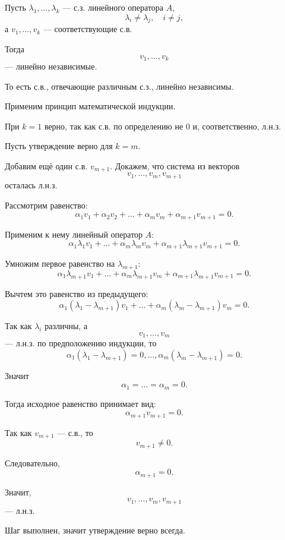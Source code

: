 \begin{theorem}
    Пусть $\lambda_1, \ldots, \lambda_k$ --- с.з. линейного оператора $A$,
    \[
        \lambda_i \neq \lambda_j,\quad i \neq j,
    \]
    а $v_1,\ldots,v_k$ --- соответствующие с.в.
    
    Тогда
    \[
        v_1,\ldots,v_k
    \]
    --- линейно независимые.
    
    То есть с.в., отвечающие различным с.з., линейно независимы.
\end{theorem}

\begin{Proof}
    Применим принцип математической индукции.
    
    При $k = 1$ верно, так как с.в. по определению не $0$ и, соответственно, л.н.з.
    
    Пусть утверждение верно для $k = m$.
    
    Добавим ещё один с.в. $v_{m+1}$. Докажем, что система из векторов
    \[
        v_1,\ldots,v_m,v_{m+1}
    \]
    осталась л.н.з.
    
    Рассмотрим равенство:
    \[
        \alpha_1v_1+\alpha_2v_2+\ldots+\alpha_mv_m+\alpha_{m+1}v_{m+1}=0.
    \]
    
    Применим к нему линейный оператор $A$:
    \[
        \alpha_1\lambda_1v_1+\ldots+\alpha_m\lambda_mv_m
        +\alpha_{m+1}\lambda_{m+1}v_{m+1}=0.
    \]
    
    Умножим первое равенство на $\lambda_{m+1}$:
    \[
        \alpha_1\lambda_{m+1}v_1+\ldots+\alpha_m\lambda_{m+1}v_m
        +\alpha_{m+1}\lambda_{m+1}v_{m+1}=0.
    \]
    
    Вычтем это равенство из предыдущего:
    \[
        \alpha_1(\lambda_1-\lambda_{m+1})v_1
        +\ldots+
        \alpha_m(\lambda_m-\lambda_{m+1})v_m
        =
        0.
    \]
    
    Так как $\lambda_i$ различны, а
    \[
        v_1,\ldots,v_m
    \]
    --- л.н.з. по предположению индукции, то
    \[
        \alpha_1(\lambda_1-\lambda_{m+1})=0,
        \ldots,
        \alpha_m(\lambda_m-\lambda_{m+1})=0.
    \]
    
    Значит
    \[
        \alpha_1=\ldots=\alpha_m=0.
    \]
    
    Тогда исходное равенство принимает вид:
    \[
        \alpha_{m+1}v_{m+1}=0.
    \]
    
    Так как $v_{m+1}$ --- с.в., то
    \[
        v_{m+1}\neq 0.
    \]
    
    Следовательно,
    \[
        \alpha_{m+1}=0.
    \]
    
    Значит,
    \[
        v_1,\ldots,v_m,v_{m+1}
    \]
    --- л.н.з.
    
    Шаг выполнен, значит утверждение верно всегда.
\end{Proof}
